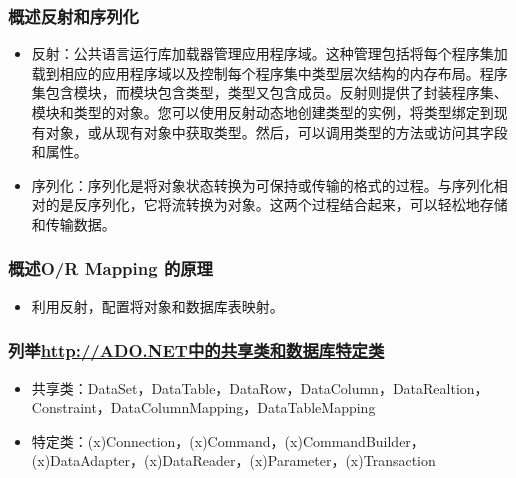 \documentclass[9pt, b5paper]{article}
\begin{document}
\subsubsection{概述反射和序列化}
\label{sec-1-2-108}
\begin{itemize}
\item 反射：公共语言运行库加载器管理应用程序域。这种管理包括将每个程序集加载到相应的应用程序域以及控制每个程序集中类型层次结构的内存布局。程序集包含模块，而模块包含类型，类型又包含成员。反射则提供了封装程序集、模块和类型的对象。您可以使用反射动态地创建类型的实例，将类型绑定到现有对象，或从现有对象中获取类型。然后，可以调用类型的方法或访问其字段和属性。
\item 序列化：序列化是将对象状态转换为可保持或传输的格式的过程。与序列化相对的是反序列化，它将流转换为对象。这两个过程结合起来，可以轻松地存储和传输数据。
\end{itemize}
\subsubsection{概述O/R Mapping 的原理}
\label{sec-1-2-109}
\begin{itemize}
\item 利用反射，配置将对象和数据库表映射。
\end{itemize}
\subsubsection{列举\url{http://ADO.NET中的共享类和数据库特定类}}
\label{sec-1-2-110}
\begin{itemize}
\item 共享类：DataSet，DataTable，DataRow，DataColumn，DataRealtion，Constraint，DataColumnMapping，DataTableMapping
\item 特定类：(x)Connection，(x)Command，(x)CommandBuilder，(x)DataAdapter，(x)DataReader，(x)Parameter，(x)Transaction
\end{itemize}
\end{document}
